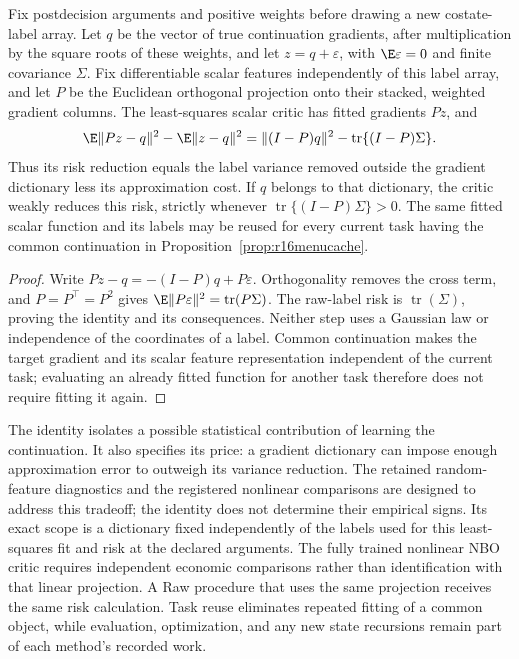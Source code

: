 \begin{proposition}
\label{prop:r16menuprojection}
Fix postdecision arguments and positive weights before drawing a new
costate-label array. Let $q$ be the vector of true continuation gradients,
after multiplication by the square roots of these weights, and let
$z=q+\varepsilon$, with $\E\varepsilon=0$ and finite covariance
$\Sigma$. Fix differentiable scalar features independently of this
label array, and let $P$ be the Euclidean orthogonal projection onto
their stacked, weighted gradient columns. The least-squares scalar
critic has fitted gradients $Pz$, and
\[
 \E\|Pz-q\|^2-\E\|z-q\|^2
   =\|(I-P)q\|^2-\operatorname{tr}\{(I-P)\Sigma\}.
\]
Thus its risk reduction equals the label variance removed outside the
gradient dictionary less its approximation cost. If $q$ belongs to that
dictionary, the critic weakly reduces this risk, strictly whenever
$\operatorname{tr}\{(I-P)\Sigma\}>0$. The same fitted scalar
function and its labels may be reused for every current task having
the common continuation in Proposition~\ref{prop:r16menucache}.
\end{proposition}

\begin{proof}
Write $Pz-q=-(I-P)q+P\varepsilon$. Orthogonality removes the
cross term, and $P=P^\top=P^2$ gives
$\E\|P\varepsilon\|^2=\operatorname{tr}(P\Sigma)$.
The raw-label risk is $\operatorname{tr}(\Sigma)$, proving the
identity and its consequences. Neither step uses a Gaussian law or
independence of the coordinates of a label. Common continuation makes
the target gradient and its scalar feature representation independent
of the current task; evaluating an already fitted function for another
task therefore does not require fitting it again.
\end{proof}

The identity isolates a possible statistical contribution of learning
the continuation. It also specifies its price: a gradient dictionary
can impose enough approximation error to outweigh its variance
reduction. The retained random-feature diagnostics and the
registered nonlinear comparisons are designed to address this tradeoff; the identity does not
determine their empirical signs. Its exact scope is a dictionary fixed
independently of the labels used for this least-squares fit and risk
at the declared arguments. The fully trained nonlinear NBO critic requires
independent economic comparisons rather than identification with that
linear projection. A Raw procedure that
uses the same projection receives the same risk calculation. Task
reuse eliminates repeated fitting of a common object, while evaluation,
optimization, and any new state recursions remain part of each method's
recorded work.



